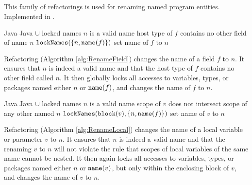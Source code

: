 \subsection{}
This family of refactorings is used for renaming named program entities. Implemented in .

\begin{algorithm}[p]
\caption{$\refactoring{Rename Field}(f : \type{Field}, n : \type{Name})$}\label{alg:RenameField}
\begin{algorithmic}[1]
\REQUIRE Java
\ENSURE Java $\cup$ locked names
\medskip
\STATE \assert $n$ is a valid name
\STATE \assert host type of $f$ contains no other field of name $n$
\STATE $\text{\texttt{lockNames}}(\{n, \text{\texttt{name}}(f)\})$
\STATE set name of $f$ to $n$
\end{algorithmic}
\end{algorithm}

Refactoring  (Algorithm \ref{alg:RenameField}) changes the name of a field $f$ to $n$. It ensures that $n$ is indeed a valid name and that the host type of $f$ contains no other field called $n$. It then globally locks all accesses to variables, types, or packages named either $n$ or $\text{\texttt{name}}(f)$, and changes the name of $f$ to $n$.

\begin{algorithm}[p]
\caption{$\refactoring{Rename Local}(v : \type{Local}, n : \type{Name})$}\label{alg:RenameLocal}
\begin{algorithmic}[1]
\REQUIRE Java
\ENSURE Java $\cup$ locked names
\medskip
\STATE \assert $n$ is a valid name
\STATE \assert scope of $v$ does not intersect scope of any other  named $n$
\STATE $\text{\texttt{lockNames}}(\text{\texttt{block}}(v), \{n, \text{\texttt{name}}(f)\})$
\STATE set name of $v$ to $n$
\end{algorithmic}
\end{algorithm}

Refactoring  (Algorithm \ref{alg:RenameLocal}) changes the name of a local variable or parameter $v$ to $n$. It ensures that $n$ is indeed a valid name and that the renaming $v$ to $n$ will not violate the rule that scopes of local variables of the same name cannot be nested. It then again locks all accesses to variables, types, or packages named either $n$ or $\text{\texttt{name}}(v)$, but only within the enclosing block of $v$, and changes the name of $v$ to $n$.

